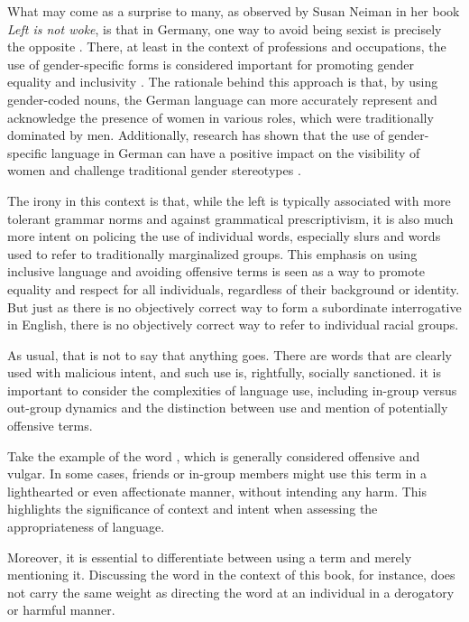 What may come as a surprise to many, as observed by Susan Neiman in her book \textit{Left is not woke}, is that in Germany, one way to avoid being sexist is precisely the opposite \citep{neiman2023}. There, at least in the context of professions and occupations, the use of gender-specific forms is considered important for promoting gender equality and inclusivity \citep{diewald2018}. The rationale behind this approach is that, by using gender-coded nouns, the German language can more accurately represent and acknowledge the presence of women in various roles, which were traditionally dominated by men. Additionally, research has shown that the use of gender-specific language in German can have a positive impact on the visibility of women and challenge traditional gender stereotypes \citep{Vervecken2012}.

The irony in this context is that, while the left is typically associated with more tolerant grammar norms and against grammatical prescriptivism, it is also much more intent on policing the use of individual words, especially slurs and words used to refer to traditionally marginalized groups. This emphasis on using inclusive language and avoiding offensive terms is seen as a way to promote equality and respect for all individuals, regardless of their background or identity. But just as there is no objectively correct way to form a subordinate interrogative in English, there is no objectively correct way to refer to individual racial groups.

As usual, that is not to say that anything goes. There are words that are clearly used with malicious intent, and such use is, rightfully, socially sanctioned. it is important to consider the complexities of language use, including in-group versus out-group dynamics and the distinction between use and mention of potentially offensive terms.

Take the example of the word , which is generally considered offensive and vulgar. In some cases, friends or in-group members might use this term in a lighthearted or even affectionate manner, without intending any harm. This highlights the significance of context and intent when assessing the appropriateness of language.

Moreover, it is essential to differentiate between using a term and merely mentioning it. Discussing the word  in the context of this book, for instance, does not carry the same weight as directing the word at an individual in a derogatory or harmful manner.




